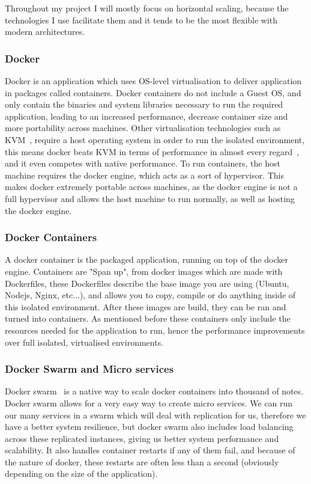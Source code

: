 \documentclass[titlepage]{article}
\begin{document}
Throughout my project I will mostly focus on horizontal scaling, because the technologies I use facilitate them and it tends to be the most flexible with modern architectures.

\subsubsection{Docker}
Docker is an application which uses OS-level virtualisation to deliver application in packages called containers. Docker containers do not include a Guest OS, and only contain the binaries and system libraries necessary to run the required application, leading to an increased performance, decrease container size and more portability across machines. Other virtualisation technologies such as KVM~\cite{kvm}, require a host operating system in order to run the isolated environment, this means docker beats KVM in terms of performance in almost every regard~\cite{docker_performance}, and it even competes with native performance. To run containers, the host machine requires the docker engine, which acts as a sort of hypervisor. This makes docker extremely portable across machines, as the docker engine is not a full hypervisor and allows the host machine to run normally, as well as hosting the docker engine.

\subsubsection{Docker Containers}
A docker container is the packaged application, running on top of the docker engine. Containers are "Span up", from docker images which are made with Dockerfiles, these Dockerfiles describe the base image you are using (Ubuntu, Nodejs, Nginx, etc...), and allows you to copy, compile or do anything inside of this isolated environment. After these images are build, they can be ran and turned into containers. As mentioned before these containers only include the resources needed for the application to run, hence the performance improvements over full isolated, virtualised environments.

\subsubsection{Docker Swarm and Micro services}
Docker swarm~\cite{docker_swarm} is a native way to scale docker containers into thousand of notes. Docker swarm allows for a very easy way to create micro services. We can run our many services in a swarm which will deal with replication for us, therefore we have a better system resilience, but docker swarm also includes load balancing across these replicated instances, giving us better system performance and scalability. It also handles container restarts if any of them fail, and because of the nature of docker, these restarts are often less than a second (obviously depending on the size of the application).
\end{document}
